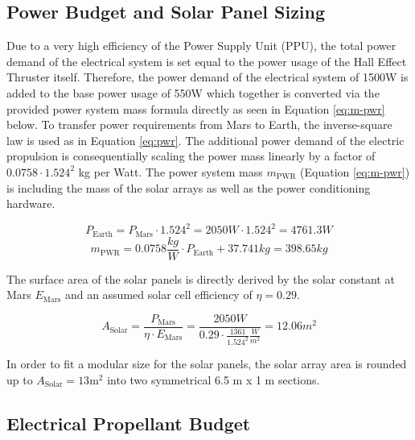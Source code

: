 \documentclass[conference]{IEEEtran}
\begin{document}
\subsection{Power Budget and Solar Panel Sizing}
\label{sec:solar}
Due to a very high efficiency of the Power Supply Unit (PPU), the total power demand of the electrical system is set equal to the power usage of the Hall Effect Thruster itself.
Therefore, the power demand of the electrical system of 1500W is added to the base power usage of 550W which together is converted via the provided power system mass formula directly as seen in Equation \ref{eq:m-pwr} below.
To transfer power requirements from Mars to Earth, the inverse-square law is used as in Equation \ref{eq:pwr}.
The additional power demand of the electric propulsion is consequentially scaling the power mass linearly by a factor of $0.0758 \cdot 1.524^2$ kg per Watt.
The power system mass $m_{\mathrm{PWR}}$ (Equation \ref{eq:m-pwr}) is including the mass of the solar arrays as well as the power conditioning hardware.

\begin{equation}
    P_{\mathrm{Earth}} = P_{\mathrm{Mars}} \cdot 1.524^2 = 2050W \cdot 1.524^2 = 4761.3 W
    \label{eq:pwr}
\end{equation}
\begin{equation}
    m_{\mathrm{PWR}} = 0.0758 \frac{kg}{W} \cdot P_{\mathrm{Earth}}  + 37.741 kg = 398.65 kg 
    \label{eq:m-pwr}
\end{equation}

The surface area of the solar panels is directly derived by the solar constant at Mars $E_{\mathrm{Mars}}$ and an assumed solar cell efficiency of $\eta=0.29$.

\begin{equation}
    A_{\mathrm{Solar}} = \frac{P_{\mathrm{Mars}}}{\eta \cdot E_{\mathrm{Mars}}} = \frac{2050W}{0.29 \cdot \frac{1361}{1.524^2}\frac{W}{m^2}} =  12.06 m^2
    \label{eq:solarA}
\end{equation}

In order to fit a modular size for the solar panels, the solar array area is rounded up to $A_{\mathrm{Solar}}=13 \mathrm{m^2}$ into two symmetrical 6.5 m x 1 m sections.

\subsection{Electrical Propellant Budget}
\end{document}
